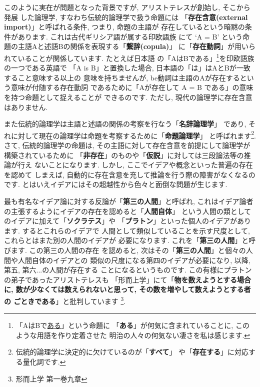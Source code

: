 \documentclass[b5j,8pt,twocolumn]{ltjsarticle}
\begin{document}
このように実在が問題となった背景ですが, アリストテレスが創始し, そこから発展
した論理学, すなわち伝統的論理学で扱う命題には
「\textbf{存在含意(external import)}」と呼ばれる条件, つまり, 命題の主語が
存在しているという暗黙の条件があります. これは古代ギリシア語が属する印欧語族
にて `A = B' という命題の主語Aと述語Bの関係を表現する「\textbf{繋辞(copula)}」
に「\textbf{存在動詞}」が用いられていることが関係しています. たとえば日本語
の「AはBである」\footnote{「AはBで\underline{ある}」という命題に
「\textbf{ある}」が何気に含まれていることに, このような用語を作り定着させた
明治の人々の何気ない凄さを私は感じます.}を印欧語族の一つである英語で
「A is B」と置換した場合, 日本語の「は」はAとBが一致すること意味する以上の
意味を持ちませんが, be動詞は主語のAが存在するという意味が付随する存在動詞
であるために「Aが存在して A = B である」の意味を持つ命題として捉えることが
できるのです. ただし, 現代の論理学に存在含意はありません.
\newline 

また伝統的論理学は主語と述語の関係の考察を行なう「\textbf{名辞論理学}」
であり, それに対して現在の論理学は命題を考察するために「\textbf{命題論理学}」
と呼ばれます\footnote{伝統的論理学に決定的に欠けているのが「\textbf{すべて}」
や「\textbf{存在する}」に対応する量化詞です.}. さて, 伝統的論理学の命題は,
 その主語に対して存在含意を前提にして論理学が構築されているために
「\textbf{非存在}」のものや「\textbf{仮説}」に対しては三段論法等の推論が行え
ないことになります. しかし, ここでイデアや概念といった普遍の存在を認めて
しまえば, 自動的に存在含意を充して推論を行う際の障害がなくなるのです.
とはいえイデアにはその超越性から色々と面倒な問題が生じます.
\newline

最も有名なイデア論に対する反論が「\textbf{第三の人間}」と呼ばれ, 
 これはイデア論者の主張するようにイデアの存在を認めると「\textbf{人間自体}」
という人間の類としてのイデアに加えて「\textbf{ソクラテス}」や
「\textbf{プラトン}」といった個人のイデアがあります. するとこれらのイデアで
人間として類似していることを示す尺度として, これらとはまた別の人間のイデアが
必要になります. これを「\textbf{第三の人間}」と呼びます. この第三の人間の存在
を認めると, 次はその「\textbf{第三の人間}」と個々の人間や人間自体のイデアとの
類似の尺度になる第四のイデアが必要になり, 以降, 第五, 第六...の人間が存在する
ことになるというものです.  この有様にプラトンの弟子であったアリストテレスも
「形而上学」\cite{アリストテレス2}にて「\textbf{物を数えようとする場合に,
 数が少なくては数えられないと思って, その数を増やして数えようとする者の
ごときである}」と批判しています\cite{アリストテレス2}
\footnote{形而上学 第一巻九章}.
\newline
\end{document}
